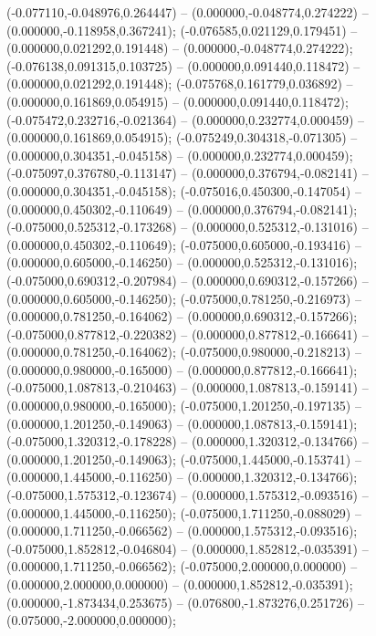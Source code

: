  (-0.077110,-0.048976,0.264447) -- (0.000000,-0.048774,0.274222) -- (0.000000,-0.118958,0.367241);
 (-0.076585,0.021129,0.179451) -- (0.000000,0.021292,0.191448) -- (0.000000,-0.048774,0.274222);
 (-0.076138,0.091315,0.103725) -- (0.000000,0.091440,0.118472) -- (0.000000,0.021292,0.191448);
 (-0.075768,0.161779,0.036892) -- (0.000000,0.161869,0.054915) -- (0.000000,0.091440,0.118472);
 (-0.075472,0.232716,-0.021364) -- (0.000000,0.232774,0.000459) -- (0.000000,0.161869,0.054915);
 (-0.075249,0.304318,-0.071305) -- (0.000000,0.304351,-0.045158) -- (0.000000,0.232774,0.000459);
 (-0.075097,0.376780,-0.113147) -- (0.000000,0.376794,-0.082141) -- (0.000000,0.304351,-0.045158);
 (-0.075016,0.450300,-0.147054) -- (0.000000,0.450302,-0.110649) -- (0.000000,0.376794,-0.082141);
 (-0.075000,0.525312,-0.173268) -- (0.000000,0.525312,-0.131016) -- (0.000000,0.450302,-0.110649);
 (-0.075000,0.605000,-0.193416) -- (0.000000,0.605000,-0.146250) -- (0.000000,0.525312,-0.131016);
 (-0.075000,0.690312,-0.207984) -- (0.000000,0.690312,-0.157266) -- (0.000000,0.605000,-0.146250);
 (-0.075000,0.781250,-0.216973) -- (0.000000,0.781250,-0.164062) -- (0.000000,0.690312,-0.157266);
 (-0.075000,0.877812,-0.220382) -- (0.000000,0.877812,-0.166641) -- (0.000000,0.781250,-0.164062);
 (-0.075000,0.980000,-0.218213) -- (0.000000,0.980000,-0.165000) -- (0.000000,0.877812,-0.166641);
 (-0.075000,1.087813,-0.210463) -- (0.000000,1.087813,-0.159141) -- (0.000000,0.980000,-0.165000);
 (-0.075000,1.201250,-0.197135) -- (0.000000,1.201250,-0.149063) -- (0.000000,1.087813,-0.159141);
 (-0.075000,1.320312,-0.178228) -- (0.000000,1.320312,-0.134766) -- (0.000000,1.201250,-0.149063);
 (-0.075000,1.445000,-0.153741) -- (0.000000,1.445000,-0.116250) -- (0.000000,1.320312,-0.134766);
 (-0.075000,1.575312,-0.123674) -- (0.000000,1.575312,-0.093516) -- (0.000000,1.445000,-0.116250);
 (-0.075000,1.711250,-0.088029) -- (0.000000,1.711250,-0.066562) -- (0.000000,1.575312,-0.093516);
 (-0.075000,1.852812,-0.046804) -- (0.000000,1.852812,-0.035391) -- (0.000000,1.711250,-0.066562);
 (-0.075000,2.000000,0.000000) -- (0.000000,2.000000,0.000000) -- (0.000000,1.852812,-0.035391);
 (0.000000,-1.873434,0.253675) -- (0.076800,-1.873276,0.251726) -- (0.075000,-2.000000,0.000000);
